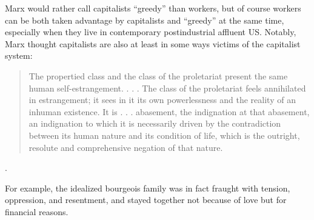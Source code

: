 \documentclass[10pt, letterpaper]{article}
\begin{document}
\begin{spacing}{1.8}
Marx would rather call capitalists ``greedy'' than workers, but  of course
workers can be both taken advantage by capitalists and ``greedy'' at the same
time, especially when they live in contemporary postindustrial affluent US.
Notably, Marx thought capitalists are also at least in some ways victims of the
capitalist system:
\begin{quote}
  The propertied class and the class of the proletariat present the same human
  self-estrangement. . . . The class of the proletariat feels annihilated in
  estrangement; it sees in it its own powerlessness and the reality of an
  inhuman existence. It is . . . abasement, the indignation at that abasement,
  an indignation to which it is necessarily driven by the contradiction between
  its human nature and its condition of life, which is the outright, resolute
  and comprehensive negation of that nature.
\end{quote} \citep[cited in][p 381]{byron16}.

For example, the idealized bourgeois family was in fact fraught with tension, oppression, and resentment, and stayed together not because of love but for financial reasons.




\end{spacing}
\end{document}
